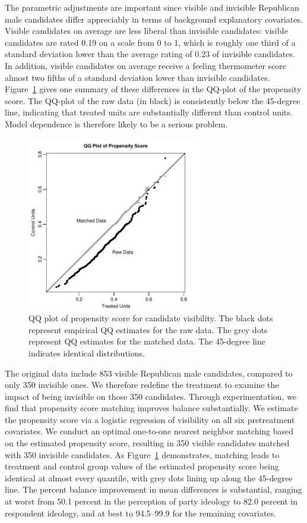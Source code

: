 \documentclass[11pt,titlepage]{article}
\begin{document}
The parametric adjustments are important since visible and invisible
Republican male candidates differ appreciably in terms of background
explanatory covariates.  Visible candidates on average are less
liberal than invisible candidates: visible candidates are rated 0.19
on a scale from 0 to 1, which is roughly one third of a standard
deviation lower than the average rating of 0.23 of invisible
candidates.  In addition, visible candidates on average receive a
feeling thermometer score almost two fifths of a standard deviation
lower than invisible candidates.  Figure~\ref{fg:kochQQ} gives one
summary of these differences in the QQ-plot of the propensity score.
The QQ-plot of the raw data (in black) is consistently below the
45-degree line, indicating that treated units are substantially
different than control units.  Model dependence is therefore likely to
be a serious problem.
\begin{figure}[t] 
 \begin{center}
   \includegraphics[height=3in,angle=0]{figs/kochqq.pdf}
 \end{center} 
 \vspace{-0.275in}
 \caption{QQ plot of propensity score for candidate visibility. The
   black dots represent empirical QQ estimates for the raw data.  The
   grey dots represent QQ estimates for the matched data.  The
   45-degree line indicates identical distributions.}
 \label{fg:kochQQ}
\end{figure}

The original data include 853 visible Republican male candidates,
compared to only 350 invisible ones.  We therefore redefine the
treatment to examine the impact of being invisible on those 350
candidates.  Through experimentation, we find that propensity score
matching improves balance substantially.  We estimate the propensity
score via a logistic regression of visibility on all six pretreatment
covariates.  We conduct an optimal one-to-one nearest neighbor
matching based on the estimated propensity score, resulting in 350
visible candidates matched with 350 invisible candidates.  As
Figure~\ref{fg:kochQQ} demonstrates, matching leads to treatment and
control group values of the estimated propensity score being identical
at almost every quantile, with grey dots lining up along the 45-degree
line.  The percent balance improvement in mean differences is
substantial, ranging at worst from 50.1 percent in the perception of
party ideology to 82.0 percent in respondent ideology, and at best to
94.5--99.9 for the remaining covariates.
\end{document}
